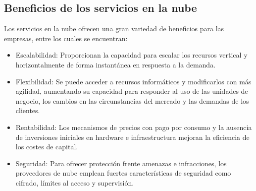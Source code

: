 \subsection{Beneficios de los servicios en la nube}
Los servicios en la nube ofrecen una gran variedad de beneficios para las empresas, entre los cuales se encuentran:
    \begin{itemize}
        \item Escalabilidad: Proporcionan la capacidad para escalar los recursos vertical y horizontalmente de forma instantánea en respuesta a la demanda.
        \item Flexibilidad: Se puede acceder a recursos informáticos y modificarlos con más agilidad, aumentando su capacidad para responder al uso de las unidades de negocio, los cambios en las circunstancias del mercado y las demandas de los clientes.
        \item Rentabilidad: Los mecanismos de precios con pago por consumo y la ausencia de inversiones iniciales en hardware e infraestructura mejoran la eficiencia de los costes de capital.
        \item Seguridad: Para ofrecer protección frente amenazas e infracciones, los proveedores de nube emplean fuertes características de seguridad como cifrado, límites al acceso y supervisión.
    \end{itemize}
